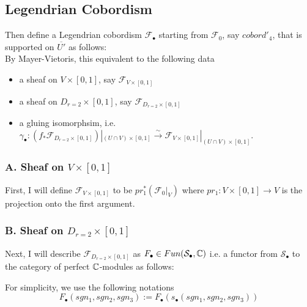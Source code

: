 \subsection{Legendrian Cobordism}
Then define a Legendrian cobordism $\mathscr{F}_\bullet$ starting from $\mathscr{F}_0$, say $cobord'_4$, that is supported on $\overline{U'}$ as follows:\\

By Mayer-Vietoris, this equivalent to the following data
\begin{itemize}
\item a sheaf on $V\times [0,1]$, say $\mathscr{F}_{V\times [0,1]}$

\item a sheaf on $D_{r=2}\times [0,1]$, say $\mathscr{F}_{D_{r=2}\times [0,1]}$

\item a gluing isomorphsim, i.e. $\gamma_\bullet : (f_*\mathscr{F}_{D_{r=2}\times [0,1]})|_{(U\cap V)\times [0,1]} \xrightarrow{\sim} \mathscr{F}_{V\times [0,1]}|_{(U\cap V)\times [0,1]}$.
\end{itemize}
\subsubsection{A. Sheaf on $V\times [0,1]$}
First, I will define $\mathscr{F}_{V\times [0,1]}$ to be $pr_1^*(\mathscr{F}_0|_V)$ where $pr_1 : V \times [0,1] \rightarrow V$ is the projection onto the first argument.
\subsubsection{B. Sheaf on $D_{r=2}\times [0,1]$}
Next, I will describe $\mathscr{F}_{D_{r=2}\times [0,1]}$ as $F_\bullet \in Fun(\mathcal{S}_\bullet,\mathbb{C})$ i.e. a functor from $\mathcal{S}_\bullet$ to the category of perfect $\mathbb{C}$-modules as follows: 

For simplicity, we use the following notations
\[
F_\bullet(sgn_1,sgn_2,sgn_3):= F_\bullet(s_\bullet(sgn_1,sgn_2,sgn_3))
\]

